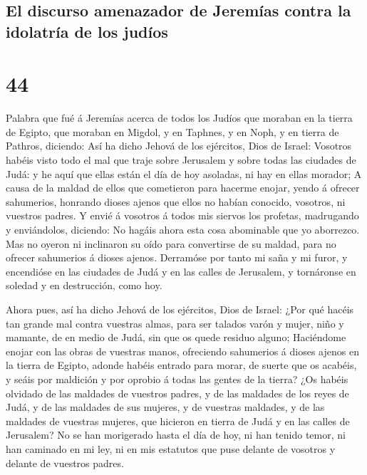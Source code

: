 \hypertarget{el-discurso-amenazador-de-jeremuxedas-contra-la-idolatruxeda-de-los-juduxedos}{%
\subsection{El discurso amenazador de Jeremías contra la idolatría de
los
judíos}\label{el-discurso-amenazador-de-jeremuxedas-contra-la-idolatruxeda-de-los-juduxedos}}

\hypertarget{section-43}{%
\section{44}\label{section-43}}

 Palabra que fué á Jeremías acerca de todos los Judíos que
moraban en la tierra de Egipto, que moraban en Migdol, y en Taphnes, y
en Noph, y en tierra de Pathros, diciendo:  Así ha dicho
Jehová de los ejércitos, Dios de Israel: Vosotros habéis visto todo el
mal que traje sobre Jerusalem y sobre todas las ciudades de Judá: y he
aquí que ellas están el día de hoy asoladas, ni hay en ellas morador;
 A causa de la maldad de ellos que cometieron para hacerme
enojar, yendo á ofrecer sahumerios, honrando dioses ajenos que ellos no
habían conocido, vosotros, ni vuestros padres.  Y envié á
vosotros á todos mis siervos los profetas, madrugando y enviándolos,
diciendo: No hagáis ahora esta cosa abominable que yo aborrezco.
 Mas no oyeron ni inclinaron su oído para convertirse de
su maldad, para no ofrecer sahumerios á dioses ajenos. 
Derramóse por tanto mi saña y mi furor, y encendióse en las ciudades de
Judá y en las calles de Jerusalem, y tornáronse en soledad y en
destrucción, como hoy.

 Ahora pues, así ha dicho Jehová de los ejércitos, Dios de
Israel: ¿Por qué hacéis tan grande mal contra vuestras almas, para ser
talados varón y mujer, niño y mamante, de en medio de Judá, sin que os
quede residuo alguno;  Haciéndome enojar con las obras de
vuestras manos, ofreciendo sahumerios á dioses ajenos en la tierra de
Egipto, adonde habéis entrado para morar, de suerte que os acabéis, y
seáis por maldición y por oprobio á todas las gentes de la tierra?
 ¿Os habéis olvidado de las maldades de vuestros padres, y
de las maldades de los reyes de Judá, y de las maldades de sus mujeres,
y de vuestras maldades, y de las maldades de vuestras mujeres, que
hicieron en tierra de Judá y en las calles de Jerusalem? 
No se han morigerado hasta el día de hoy, ni han tenido temor, ni han
caminado en mi ley, ni en mis estatutos que puse delante de vosotros y
delante de vuestros padres.

